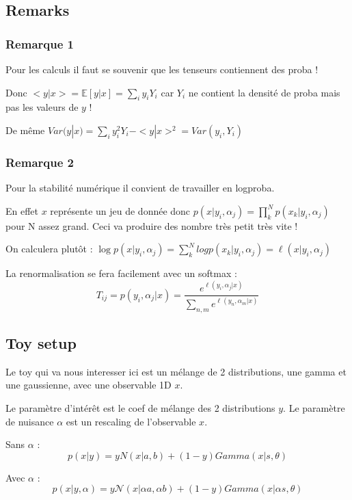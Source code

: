 \subsection{Remarks} %
\label{sub:remarks}

\subsubsection{Remarque 1}

Pour les calculs il faut se souvenir que les tenseurs contiennent des proba !

Donc $<y|x>= \mathbb E[y|x] = \sum_i y_i Y_i$ car $Y_i$ ne contient la densité de proba mais pas les valeurs de $y$ !

De même $Var(y|x) = \sum_i y_i^2 Y_i - <y|x>^2 = Var(y_i, Y_i)$

\subsubsection{Remarque 2}

Pour la stabilité numérique il convient de travailler en logproba.

En effet $x$ représente un jeu de donnée donc $p(x | y_i, \alpha_j) = \prod_k^N p(x_k | y_i, \alpha_j)$ pour N assez grand.
Ceci va produire des nombre très petit très vite !

On calculera plutôt : $\log p(x | y_i, \alpha_j) = \sum_k^N log p(x_k | y_i, \alpha_j) = \ell(x | y_i, \alpha_j)$

La renormalisation se fera facilement avec un softmax : 
$$ 
    T_{ij} = p(y_i, \alpha_j | x) = \frac{e^{\ell(y_i, \alpha_j| x)} }{\sum_{n,m} e^{\ell(y_n, \alpha_m| x)} }
$$


\subsection{Toy setup} %
\label{sub:toy_setup}

Le toy qui va nous interesser ici est un mélange de 2 distributions, une gamma et une gaussienne, avec une observable 1D $x$.

Le paramètre d'intérêt est le coef de mélange des 2 distributions $y$.
Le paramètre de nuisance $\alpha$ est un rescaling de l'observable $x$.

Sans $\alpha$ :
$$
    p(x | y) = y N(x|a, b) + (1-y) Gamma(x|s, \theta)
$$

Avec $\alpha$ :
$$
    p(x | y, \alpha) = y \mathcal N(x|\alpha a, \alpha b) + (1-y) Gamma(x|\alpha s, \theta)
$$

